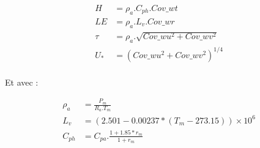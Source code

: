 
\begin{align*}
H & = \rho_a.C_{ph}.Cov\_wt \\
LE & = \rho_a.L_v.Cov\_wr  \\
\tau & = \rho_a.\sqrt{Cov\_wu^2  + Cov\_wv^2 } \\
U_* & = \left(Cov\_wu^2  + Cov\_wv^2 \right)^{1/4} \\
\end{align*}

Et avec :

\begin{align*}
\rho_a & = \frac{P_m}{R_a.T_m} \\
L_v & = (2.501 - 0.00237 * (T_m - 273.15) ) \times 10^6 \\
C_{ph} & = C_{pa}.\frac{ 1 + 1.85 * r_m } {1 + r_m } \\
\end{align*} 


